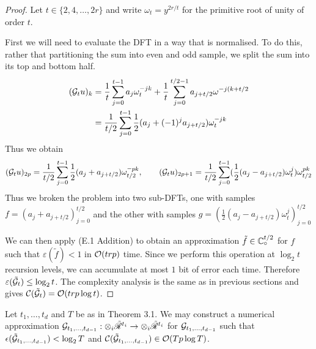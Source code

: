 \begin{proof}

    Let $t \in \{2, 4, \ldots, 2r\}$ and write $\omega_t = y^{2r/t}$ for the primitive root of unity of order $t$. 

    First we will need to evaluate the DFT in a way that is normalised. To do this, rather that partitioning the sum into even and odd sample, we split the sum into its top and bottom half. 
    \begin{align*}
        (\M{G}_t u)_k 
        &= \frac{1}{t}\sum^{t - 1}_{j=0} a_j \omega_t^{-jk} + \frac{1}{t} \sum^{t/2 - 1}_{j=0} a_{j + t/2} \omega^{-j(k + t/2}\\
        &= \frac{1}{t/2}\sum^{t - 1}_{j=0} \frac{1}{2}(a_j + (-1)^ja_{j + t/2})\omega_t^{\minus jk} \\
    \end{align*}
    Thus we obtain
    \[
        (\M{G}_t u)_{2p} = \frac{1}{t/2}\sum^{t - 1}_{j=0} \frac{1}{2}(a_j + a_{j + t/2})\omega_{t/2}^{\minus pk}, \qquad (\M{G}_t u)_{2p + 1} = \frac{1}{t/2}\sum^{t - 1}_{j=0} (\frac{1}{2}(a_j - a_{j + t/2})\omega_t^j)\omega_{t/2}^{pk}
    \]
    Thus we broken the problem into two sub-DFTs, one with samples $f = (a_j + a_{j + t/2})_{j=0}^{t/2}$ and the other with samples $g = (\frac{1}{2}(a_j - a_{j + t/2})\omega_t^j)_{j=0}^{t/2}$

    We can then apply (E.1 Addition) to obtain an approximation $\tilde{f} \in {\mathbb C}^{t/2}_\circ$ for $f$ such that $\varepsilon(\tilde{f}) < 1$ in $\mathcal O(trp)$ time. Since we perform this operation at $\log_2 t$ recursion levels, we can accumulate at most $1$ bit of error each time. Therefore $\varepsilon(\tilde{\mathcal G}_t) \le \log_2 t$.
    The complexity analysis is the same as in previous sections and gives $\mathcal C(\tilde{\mathcal G}_t) = \mathcal O(trp \log t)$.
\end{proof}

\begin{proposition}\label{prop:multi-synth}
    Let $t_1, \ldots, t_d$ and $T$ be as in Theorem 3.1. We may construct a numerical approximation $\mathcal G_{t_1, \ldots, t_{d-1}}: \otimes_i \tilde{\mathscr{R}}^{t_i} \to \otimes_i \tilde{\mathscr{R}}^{t_i}$ for $\mathcal G_{t_1, \ldots, t_{d-1}}$ such that $\epsilon(\tilde{\mathcal G}_{t_1, \ldots, t_{d-1}}) < \log_2 T$ and $\mathcal C(\tilde{\mathcal G}_{t_1, \ldots, t_{d-1}}) \in \mathcal O(Tp \log T)$.
\end{proposition}

